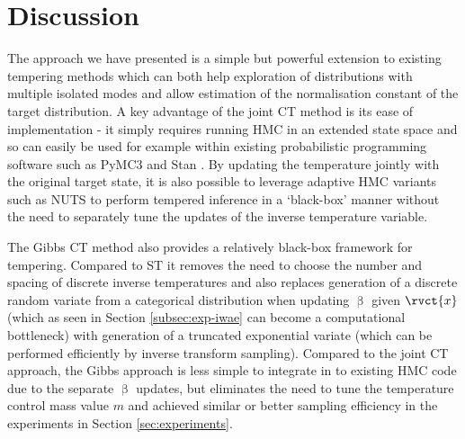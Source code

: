 
\section{Discussion}

The approach we have presented is a simple but powerful extension to existing tempering methods which can both help exploration of distributions with multiple isolated modes and allow estimation of the normalisation constant of the target distribution. A key advantage of the joint \ac{CT} method is its ease of implementation - it simply requires running \ac{HMC} in an extended state space and so can easily be used for example within existing probabilistic programming software such as PyMC3 \citep{salvatier2016probabilistic} and Stan \citep{carpenter2016stan}. By updating the temperature jointly with the original target state, it is also possible to leverage adaptive \ac{HMC} variants such as \ac{NUTS} \citep{hoffman2014no} to perform tempered inference in a `black-box' manner without the need to separately tune the updates of the inverse temperature variable.

The Gibbs \ac{CT} method also provides a relatively black-box framework for tempering. Compared to \ac{ST} it removes the need to choose the number and spacing of discrete inverse temperatures and also replaces generation of a discrete random variate from a categorical distribution when updating $\upbeta$ given $\rvct{x}$ (which as seen in Section \ref{subsec:exp-iwae} can become a computational bottleneck) with generation of a truncated exponential variate (which can be performed efficiently by inverse transform sampling). Compared to the joint \ac{CT} approach, the Gibbs approach is less simple to integrate in to existing \ac{HMC} code due to the separate $\upbeta$ updates, but eliminates the need to tune the temperature control mass value $m$ and achieved similar or better sampling efficiency in the experiments in Section \ref{sec:experiments}.

